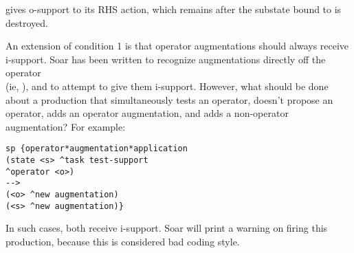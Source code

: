 gives o-support to its RHS action, which remains after the substate bound to  is destroyed. 

An extension of condition 1 is that operator augmentations should always receive i-support. Soar has been written to recognize augmentations directly off the operator \\
(ie, ), and to attempt to give them i-support. However, what should be done about a production that simultaneously tests an operator, doesn't propose an operator, adds an operator augmentation, and adds a non-operator augmentation? For example:

\begin{verbatim}
sp {operator*augmentation*application
(state <s> ^task test-support
^operator <o>)
-->
(<o> ^new augmentation)
(<s> ^new augmentation)}
\end{verbatim}


In such cases, both receive i-support. Soar will print a warning on firing this production, because this is considered bad coding style.

